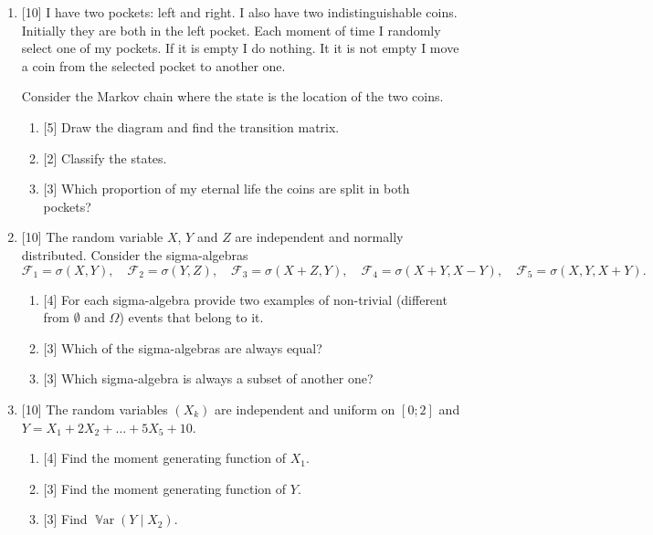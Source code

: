\documentclass[12pt]{article}
\DeclareMathOperator{\Var}{\mathbb{V}ar}
\newcommand{\cF}{\mathcal{F}}
\begin{document}
\begin{enumerate}
    \item {[10]} I have two pockets: left and right. 
    I also have two indistinguishable coins. 
    Initially they are both in the left pocket. 
    Each moment of time I randomly select one of my pockets. 
    If it is empty I do nothing. 
    It it is not empty I move a coin from the selected pocket to another one. 

    Consider the Markov chain where the state is the location of the two coins. 
    \begin{enumerate}
        \item {[5]} Draw the diagram and find the transition matrix.
        \item {[2]} Classify the states.
        \item {[3]} Which proportion of my eternal life the coins are split in both pockets?
    \end{enumerate}


    \item {[10]} The random variable $X$, $Y$ and $Z$ are independent and normally distributed. 
    Consider the sigma-algebras
    \[
        \cF_1 = \sigma(X, Y), \quad \cF_2 = \sigma(Y, Z), \quad \cF_3 = \sigma(X + Z, Y), \quad \cF_4 = \sigma(X + Y, X - Y), \quad \cF_5 = \sigma(X, Y, X + Y).
    \]

    \begin{enumerate}
        \item {[4]} For each sigma-algebra provide two examples of non-trivial (different from $\emptyset$ and $\Omega$) events that belong to it. 
        \item {[3]} Which of the sigma-algebras are always equal?
        \item {[3]} Which sigma-algebra is always a subset of another one?
    \end{enumerate}
    

    \item {[10]} The random variables $(X_k)$ are independent and uniform on $[0;2]$ and $Y = X_1 + 2X_2 + \dots + 5X_5 + 10$.
    \begin{enumerate}
        \item {[4]} Find the moment generating function of $X_1$.
        \item {[3]} Find the moment generating function of $Y$.
        \item {[3]} Find $\Var(Y \mid X_2)$.
    \end{enumerate}


\end{enumerate}
\end{document}
